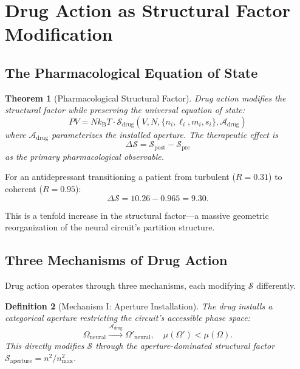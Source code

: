 \documentclass[twocolumn,10pt]{article}
\newtheorem{theorem}{Theorem}[section]
\newtheorem{definition}[theorem]{Definition}
\theoremstyle{remark}
\newcommand{\kB}{k_{\mathrm{B}}}
\newcommand{\Rorder}{R}
\begin{document}
\section{Drug Action as Structural Factor Modification}
\label{sec:drug_action}

\subsection{The Pharmacological Equation of State}

\begin{theorem}[Pharmacological Structural Factor]
\label{thm:drug_structural}
Drug action modifies the structural factor while preserving the universal equation of state:
\begin{equation}
  PV = N\kB T \cdot \mathcal{S}_{\mathrm{drug}}(V, N, \{n_i, \ell_i, m_i, s_i\}, \mathcal{A}_{\mathrm{drug}})
\end{equation}
where $\mathcal{A}_{\mathrm{drug}}$ parameterizes the installed aperture. The therapeutic effect is
\begin{equation}
  \boxed{\Delta \mathcal{S} = \mathcal{S}_{\mathrm{post}} - \mathcal{S}_{\mathrm{pre}}}
\end{equation}
as the primary pharmacological observable.
\end{theorem}

For an antidepressant transitioning a patient from turbulent ($\Rorder = 0.31$) to coherent ($\Rorder = 0.95$):
\begin{equation}
  \Delta \mathcal{S} = 10.26 - 0.965 = 9.30.
\end{equation}

This is a tenfold increase in the structural factor---a massive geometric reorganization of the neural circuit's partition structure.

\subsection{Three Mechanisms of Drug Action}

Drug action operates through three mechanisms, each modifying $\mathcal{S}$ differently.

\begin{definition}[Mechanism I: Aperture Installation]
\label{def:mech_aperture}
The drug installs a categorical aperture restricting the circuit's accessible phase space:
\begin{equation}
  \Omega_{\mathrm{neural}} \xrightarrow{\mathcal{A}_{\mathrm{drug}}} \Omega'_{\mathrm{neural}}, \quad \mu(\Omega') < \mu(\Omega).
\end{equation}
This directly modifies $\mathcal{S}$ through the aperture-dominated structural factor $\mathcal{S}_{\mathrm{aperture}} = n^2/n_{\max}^2$.
\end{definition}
\end{document}
